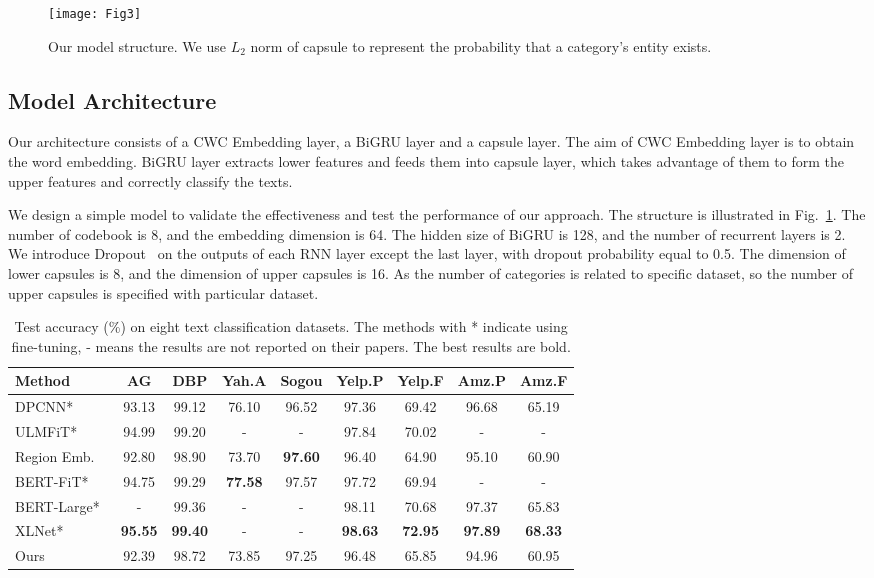 \documentclass[times,twocolumn,final]{elsarticle}
\begin{document}
\begin{figure}
  \centering
  \texttt{[image: Fig3]}
  \caption{Our model structure. We use $L_2$ norm of capsule to represent the probability that a category's entity exists.}
  \label{model_structure}
\end{figure}

\subsection{Model Architecture}

Our architecture consists of a CWC Embedding layer, a BiGRU layer and a capsule layer. The aim of CWC Embedding layer is to obtain the word embedding. BiGRU layer extracts lower features and feeds them into capsule layer, which takes advantage of them to form the upper features and correctly classify the texts.

We design a simple model to validate the effectiveness and test the performance of our approach. The structure is illustrated in Fig.~\ref{model_structure}. The number of codebook is 8, and the embedding dimension is 64. The hidden size of BiGRU is 128, and the number of recurrent layers is 2. We introduce Dropout~\cite{hinton2012improving} on the outputs of each RNN layer except the last layer, with dropout probability equal to 0.5. The dimension of lower capsules is 8, and the dimension of upper capsules is 16. As the number of categories is related to specific dataset, so the number of upper capsules is specified with particular dataset.

\begin{table*}
  \centering
  \caption{Test accuracy (\%) on eight text classification datasets. The methods with * indicate using fine-tuning, - means the results are not reported on their papers. The best results are bold.}
  \label{table:sota}
  \begin{tabular}{l|cccccccc}
    \toprule
    Method  & AG  & DBP  & Yah.A  & Sogou  & Yelp.P  & Yelp.F & Amz.P  & Amz.F \\
    \midrule
    DPCNN*~\cite{johnson2017deep}    & 93.13  & 99.12  & 76.10 & 96.52  & 97.36  & 69.42 & 96.68 & 65.19 \\
    ULMFiT*~\cite{howard2018universal}    & 94.99  & 99.20  & - & -  & 97.84  & 70.02 & - & - \\
    Region Emb.~\cite{qiao2018new}    & 92.80  & 98.90  & 73.70 & \textbf{97.60}  & 96.40  & 64.90 & 95.10 & 60.90 \\
    BERT-FiT*~\cite{sun2019fine}    & 94.75  & 99.29  & \textbf{77.58} & 97.57  & 97.72  & 69.94 & - & - \\
    BERT-Large*~\cite{xie2020unsupervised}    & -  & 99.36  & - & -  & 98.11  & 70.68 & 97.37 & 65.83 \\
    XLNet*~\cite{yang2019xlnet}    & \textbf{95.55}  & \textbf{99.40}  & - & -  & \textbf{98.63}  & \textbf{72.95} & \textbf{97.89} & \textbf{68.33} \\
    \midrule
    Ours    & 92.39         & 98.72       & 73.85      & 97.25   & 96.48  & 65.85 & 94.96 & 60.95 \\
    \bottomrule
  \end{tabular}
\end{table*}
\end{document}
